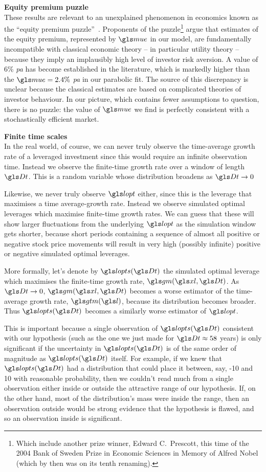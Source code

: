 \textbf{Equity premium puzzle}\\
These results are relevant to an unexplained phenomenon in economics known as the ``equity premium puzzle''~\cite{MehraPrescott1985}. Proponents of the puzzle\footnote{Which include another prize winner, Edward C.\ Prescott, this time of the 2004 Bank of Sweden Prize in Economic Sciences in Memory of Alfred Nobel (which by then was on its tenth renaming).} argue that estimates of the equity premium, represented by $\mue$ in our model, are fundamentally incompatible with classical economic theory -- in particular utility theory -- because they imply an implausibly high level of investor risk aversion. A value of 6\% \textit{pa} has become established in the literature, which is markedly higher than the $\mue=2.4\%$ \textit{pa} in our parabolic fit. The source of this discrepancy is unclear because the classical estimates are based on complicated theories of investor behaviour. In our picture, which contains fewer assumptions to question, there is no puzzle: the value of $\mue$ we find is perfectly consistent with a stochastically efficient market.

\textbf{Finite time scales}\\
In the real world, of course, we can never truly observe the time-average growth rate of a leveraged investment since this would require an infinite observation time. Instead we observe the finite-time growth rate over a window of length $\Dt$. This is a random variable whose distribution broadens as $\Dt\to0$

Likewise, we never truly observe $\lopt$ either, since this is the leverage that maximises a time average-growth rate. Instead we observe simulated optimal leverages which maximise finite-time growth rates. We can guess that these will show larger fluctuations from the underlying $\lopt$ as the simulation window gets shorter, because short periods containing a sequence of almost all positive or negative stock price movements will result in very high (possibly infinite) positive or negative simulated optimal leverages.

More formally, let's denote by $\lopts(\Dt)$ the simulated optimal leverage which maximises the finite-time growth rate, $\gm(\xl,\Dt)$. As $\Dt\to0$, $\gm(\xl,\Dt)$ becomes a worse estimator of the time-average growth rate, $\gtm(\l)$, because its distribution becomes broader. Thus $\lopts(\Dt)$ becomes a similarly worse estimator of $\lopt$. 

This is important because a single observation of $\lopts(\Dt)$ consistent with our hypothesis (such as the one we just made for $\Dt\approx58$ years) is only significant if the uncertainty in $\lopts(\Dt)$ is of the same order of magnitude as $\lopts(\Dt)$ itself. For example, if we knew that $\lopts(\Dt)$ had a distribution that could place it between, say, -10 and 10 with reasonable probability, then we couldn't read much from a single observation either inside or outside the attractive range of our hypothesis. If, on the other hand, most of the distribution's mass were inside the range, then an observation outside would be strong evidence that the hypothesis is flawed, and so an observation inside is significant.

